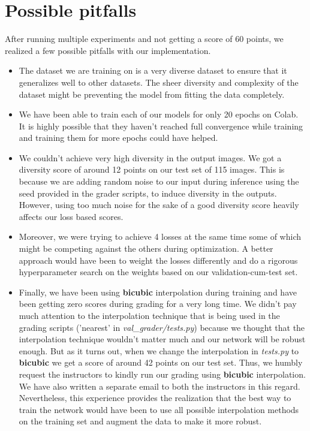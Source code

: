 \documentclass[11pt,a4paper]{article}
\begin{document}
\section{Possible pitfalls}
After running multiple experiments and not getting a score of 60 points, we realized a few possible pitfalls with our implementation.
\begin{itemize}
    \item The dataset we are training on is a very diverse dataset to ensure that it generalizes well to other datasets. The sheer diversity and complexity of the dataset might be preventing the model from fitting the data completely.
    \item We have been able to train each of our models for only 20 epochs on Colab. It is highly possible that they haven't reached full convergence while training and training them for more epochs could have helped.
    \item We couldn't achieve very high diversity in the output images. We got a diversity score of around 12 points on our test set of 115 images. This is because we are adding random noise to our input during inference using the seed provided in the grader scripts, to induce diversity in the outputs. However, using too much noise for the sake of a good diversity score heavily affects our loss based scores.
    \item Moreover, we were trying to achieve 4 losses at the same time some of which might be competing against the others during optimization. A better approach would have been to weight the losses differently and do a rigorous hyperparameter search on the weights based on our validation-cum-test set. 
    \item Finally, we have been using \textbf{bicubic} interpolation during training and have been getting zero scores during grading for a very long time. We didn't pay much attention to the interpolation technique that is being used in the grading scripts ('nearest' in \textit{val\_grader/tests.py}) because we thought that the interpolation technique wouldn't matter much and our network will be robust enough. But as it turns out, when we change the interpolation in \textit{tests.py} to \textbf{bicubic} we get a score of around 42 points on our test set. Thus, we humbly request the instructors to kindly run our grading using \textbf{bicubic} interpolation. We have also written a separate email to both the instructors in this regard. Nevertheless, this experience provides the realization that the best way to train the network would have been to use all possible interpolation methods on the training set and augment the data to make it more robust.   
\end{itemize}
\end{document}

